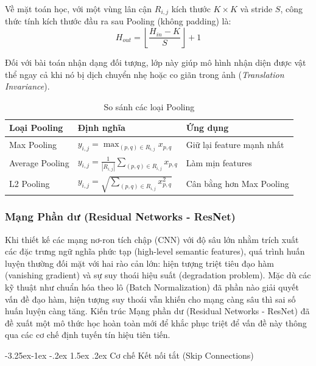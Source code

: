 \documentclass[a4paper]{article}
\makeatletter
\theoremstyle{definition}
\newcounter {subsubsubsection}[subsubsection]
\newcommand\subsubsubsection{\@startsection{subsubsubsection}{4}{\z@}%
                                     {-3.25ex\@plus -1ex \@minus -.2ex}%
                                     {1.5ex \@plus .2ex}%
                                     {\normalfont\normalsize\bfseries}}
\makeatother
\begin{document}
Về mặt toán học, với một vùng lân cận $R_{i,j}$ kích thước $K \times K$ và stride $S$, công thức tính kích thước đầu ra sau Pooling (không padding) là:
\begin{equation}
	H_{out} = \left\lfloor \frac{H_{in} - K}{S} \right\rfloor + 1
\end{equation}

Đối với bài toán nhận dạng đối tượng, lớp này giúp mô hình nhận diện được vật thể ngay cả khi nó bị dịch chuyển nhẹ hoặc co giãn trong ảnh (\textit{Translation Invariance}).

\begin{table}[H]
	\centering
	\caption{So sánh các loại Pooling}
	\begin{tabularx}{\textwidth}{|l|X|X|}
		\hline
		\textbf{Loại Pooling} & \textbf{Định nghĩa}                                             & \textbf{Ứng dụng}         \\
		\hline
		Max Pooling           & $y_{i,j} = \max_{(p,q) \in R_{i,j}} x_{p,q}$                    & Giữ lại feature mạnh nhất \\
		\hline
		Average Pooling       & $y_{i,j} = \frac{1}{|R_{i,j}|}\sum_{(p,q) \in R_{i,j}} x_{p,q}$ & Làm mịn features          \\
		\hline
		L2 Pooling            & $y_{i,j} = \sqrt{\sum_{(p,q) \in R_{i,j}} x_{p,q}^2}$           & Cân bằng hơn Max Pooling  \\
		\hline
	\end{tabularx}
	\label{tab:pooling}
\end{table}

\subsubsection{Mạng Phần dư (Residual Networks - ResNet)}

Khi thiết kế các mạng nơ-ron tích chập (CNN) với độ sâu lớn nhằm trích xuất các đặc trưng ngữ nghĩa phức tạp (high-level semantic features), quá trình huấn luyện thường đối mặt với hai rào cản lớn: hiện tượng triệt tiêu đạo hàm (vanishing gradient) và sự suy thoái hiệu suất (degradation problem). Mặc dù các kỹ thuật như chuẩn hóa theo lô (Batch Normalization) đã phần nào giải quyết vấn đề đạo hàm, hiện tượng suy thoái vẫn khiến cho mạng càng sâu thì sai số huấn luyện càng tăng. Kiến trúc Mạng phần dư (Residual Networks - ResNet) đã đề xuất một mô thức học hoàn toàn mới để khắc phục triệt để vấn đề này thông qua các cơ chế định tuyến tín hiệu tiên tiến.

\subsubsubsection{Cơ chế Kết nối tắt (Skip Connections)}
\end{document}
